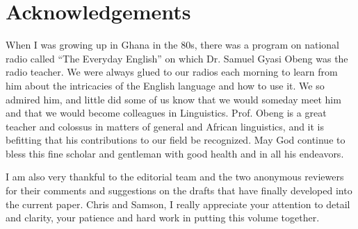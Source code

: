 \documentclass[output=paper,colorlinks,citecolor=brown]{langscibook}
\begin{document}
\section*{Acknowledgements}

When I was growing up in Ghana in the 80s, there was a program on national radio called “The Everyday English” on which Dr. Samuel Gyasi Obeng was the radio teacher. We were always glued to our radios each morning to learn from him about the intricacies of the English language and how to use it. We so admired him, and little did some of us know that we would someday meet him and that we would become colleagues in Linguistics. Prof. Obeng is a great teacher and colossus in matters of general and African linguistics, and it is befitting that his contributions to our field be recognized. May God continue to bless this fine scholar and gentleman with good health and in all his endeavors. 

I am also very thankful to the editorial team and the two anonymous reviewers for their comments and suggestions on the drafts that have finally developed into the current paper. Chris and Samson, I really appreciate your attention to detail and clarity, your patience and hard work in putting this volume together.


{\sloppy\printbibliography[heading=subbibliography,notkeyword=this]}
\end{document}
